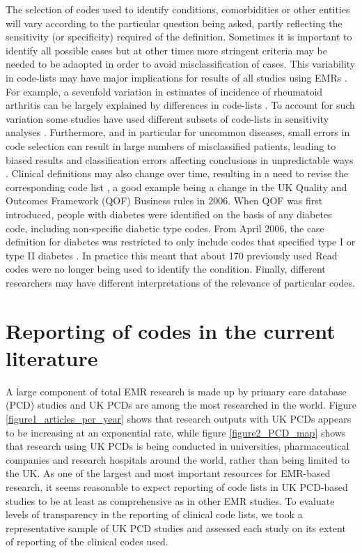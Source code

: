 \documentclass[10pt]{article}
\begin{document}
The selection of codes used to identify conditions, comorbidities or other entities will vary according to the particular question being asked, partly reflecting the sensitivity (or specificity) required of the definition. Sometimes it is important to identify all possible cases but at other times more stringent criteria may be needed to be adaopted in order to avoid misclassification of cases. This variability in code-lists may have major implications for results of all studies using EMRs \cite{Nicholson2011}. For example, a sevenfold variation in estimates of incidence of rheumatoid arthritis can be largely explained by differences in code-lists \cite{Garcia2009, Watson2003}.  To account for such variation some studies have used different subsets of code-lists in sensitivity analyses \cite{Doran2011, Herrett2010}.  Furthermore, and in particular for uncommon diseases, small errors in code selection can result in large numbers of misclassified patients, leading to biased results and classification errors affecting conclusions in unpredictable ways \cite{Manuel2010}. Clinical definitions may also change over time, resulting in a need to revise the corresponding code list \cite{Gulliford2009}, a good example being a change in the UK Quality and Outcomes Framework (QOF) Business rules in 2006. When QOF was first introduced, people with diabetes were identified on the basis of any diabetes code, including non-specific diabetic type codes.  From April 2006, the case definition for diabetes was restricted to only include codes that specified type I or type II diabetes \cite{Hippisley-Cox2006}.  In practice this meant that about 170 previously used Read codes were no longer being used to identify the condition. Finally, different researchers may have different interpretations of the relevance of particular codes.

\section*{Reporting of codes in the current literature}

A large component of total EMR research is made up by primary care database (PCD) studies and UK PCDs are among the most researched in the world.  Figure \ref{figure1_articles_per_year} shows that research outputs with UK PCDs appears to be increasing at an exponential rate, while figure \ref{figure2_PCD_map} shows that research using UK PCDs is being conducted in universities, pharmaceutical companies and research hospitals around the world, rather than being limited to the UK.  As one of the largest and most important resources for EMR-based research, it seems reasonable to expect reporting of code lists in UK PCD-based studies to be at least as comprehensive as in other EMR studies.  To evaluate levels of transparency in the reporting of clinical code lists, we took a representative sample of UK PCD studies and assessed each study on its extent of reporting of the clinical codes used.
\end{document}
